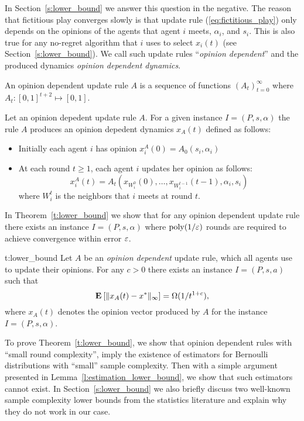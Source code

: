 In Section~\ref{s:lower_bound} we answer this question in the negative.
The reason that fictitious play converges slowly is that
update rule (\ref{eq:fictitious_play})
only depends on the opinions of the agents that agent $i$ meets,
$\alpha_i$, and $s_i$. This is also true for any no-regret algorithm
that $i$ uses to select $x_i(t)$ (see Section~\ref{s:lower_bound}).
We call such update rules \enquote{\emph{opinion dependent}}
and the produced dynamics \emph{opinion dependent dynamics}.

\begin{definition}\label{d:opinion_dependent_dynamics}
An opinion dependent update rule $A$ is a sequence of 
functions $(A_t)_{t=0}^\infty$ where
$A_t: [0,1]^{t+2}\mapsto [0,1]$.
\end{definition}

\begin{definition}\label{d:opinion_dependent_dynamics}
Let an opinion depedent update rule $A$. For a given instance $I=(P,s,\alpha)$
the rule $A$ produces an opinion depedent dynamics $x_A(t)$ defined as follows:
\begin{itemize}
 \item Initially each agent $i$ has opinion $x_i^A(0)=A_0(s_i,\alpha_i)$
 \item At each round $t\geq 1$, each agent $i$ updates her opinion as follows:
 \[x_i^A(t)=A_t(x_{W_i^0}(0),\dots,x_{W_i^{t-1}}(t-1),\alpha_i,s_i)\]
where $W_i^t$ is the neighbors that $i$ meets at round $t$.
\end{itemize}
\end{definition}


In Theorem~\ref{t:lower_bound} we
show that for any opinion dependent update rule there exists an instance
$I = (P,s,\alpha)$ where $\mathrm{poly}(1/\varepsilon)$ rounds are required to
achieve convergence within error $\varepsilon$.
\begin{reptheorem}{t:lower_bound}
  Let $A$ be an \emph{opinion dependent} update rule, which all
  agents use to update their opinions.
  For any $c>0$ there exists an instance $I=(P,s,a)$ such that
  \[
    \Exp{\norm{\infty}{x_A(t) - x^*}} = \Omega(1/t^{1+c}),
  \]
  where $x_A(t)$ denotes the opinion vector produced by $A$
  for the instance $I=(P,s,\alpha)$.
\end{reptheorem}
%
To prove Theorem~\ref{t:lower_bound}, we show that opinion dependent rules with
\enquote{small round complexity}, imply the existence
of estimators for Bernoulli distributions with
\enquote{small} sample complexity. Then with a simple argument
presented in Lemma~\ref{l:estimation_lower_bound},
we show that such estimators cannot exist.
In Section~\ref{s:lower_bound} we also
briefly discuss two well-known sample complexity lower bounds
from the statistics literature and explain why they do not work in our case.

